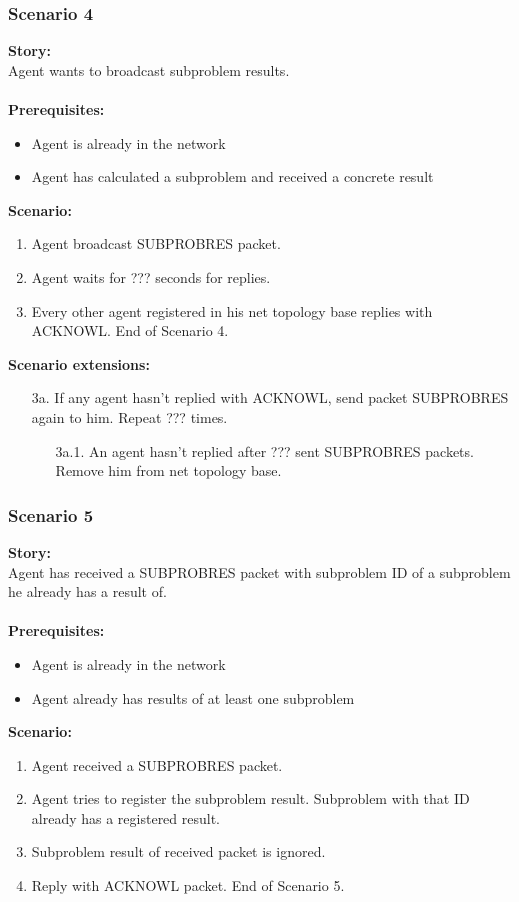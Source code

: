 \documentclass{article}
\begin{document}
\subsubsection{Scenario 4}
\noindent\textbf{Story:} \\
Agent wants to broadcast subproblem results. \\\\
\textbf{Prerequisites:}
\begin{itemize}
    \item Agent is already in the network
    \item Agent has calculated a subproblem and received a concrete result
\end{itemize}
\textbf{Scenario:}
\begin{enumerate}
    \item Agent broadcast SUBPROBRES packet.
    \item Agent waits for ??? seconds for replies.
    \item Every other agent registered in his net topology base replies with ACKNOWL. End of Scenario 4.
\end{enumerate}
\textbf{Scenario extensions:}
\begin{itemize}
    \item[3a.] If any agent hasn't replied with ACKNOWL, send packet SUBPROBRES again to him. Repeat ??? times. 
    \begin{itemize}
        \item[3a.1.] An agent hasn't replied after ??? sent SUBPROBRES packets. Remove him from net topology base.
    \end{itemize} 
\end{itemize}

\subsubsection{Scenario 5}
\noindent\textbf{Story:} \\
Agent has received a SUBPROBRES packet with subproblem ID of a subproblem he already has a result of. \\\\
\textbf{Prerequisites:}
\begin{itemize}
    \item Agent is already in the network
    \item Agent already has results of at least one subproblem
\end{itemize}
\textbf{Scenario:}
\begin{enumerate}
    \item Agent received a SUBPROBRES packet.
    \item Agent tries to register the subproblem result. Subproblem with that ID already has a registered result.
    \item Subproblem result of received packet is ignored. 
    \item Reply with ACKNOWL packet. End of Scenario 5.
\end{enumerate}
\end{document}
